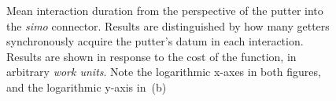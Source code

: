 \begin{figure}
	\centering
	\caption[Interaction duration with parallel getters.]{Mean interaction duration from the perspective of the putter into the \textit{simo} connector. Results are distinguished by how many getters synchronously acquire the putter's datum in each interaction. Results are shown in response to the cost of the  function, in arbitrary \textit{work units}.
		Note the logarithmic x-axes in both figures, and the logarithmic y-axis in~(b)}
	\label{fig:simo}
\end{figure}


